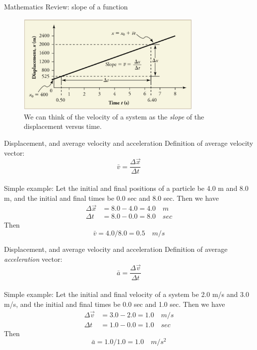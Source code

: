 \documentclass{beamer}
\begin{document}
\begin{frame}{Mathematics Review: slope of a function}
\begin{figure}
\includegraphics[width=0.8\textwidth]{figures/slope.png}
\caption{\label{fig:slope} We can think of the velocity of a system as the \textit{slope} of the displacement versus time.}
\end{figure}
\end{frame}

\begin{frame}{Displacement, and average velocity and acceleration}
Definition of average velocity vector:
\begin{equation}
\boxed{\bar{v} = \frac{\Delta\vec{x}}{\Delta t}}
\end{equation} \\
\vspace{0.5cm}
Simple example: Let the initial and final positions of a particle be 4.0 m and 8.0 m, and the initial and final times be 0.0 sec and 8.0 sec.  Then we have 
\begin{align}
\Delta \vec{x} &= 8.0 - 4.0 = 4.0 \quad m \\
\Delta t &= 8.0 - 0.0 = 8.0 \quad sec
\end{align}
Then
\begin{equation}
\bar{v} = 4.0/8.0 = 0.5 \quad m/s
\end{equation}
\end{frame}

\begin{frame}{Displacement, and average velocity and acceleration}
Definition of average \textit{acceleration} vector:
\begin{equation}
\boxed{\bar{a} = \frac{\Delta \vec{v}}{\Delta t}}
\end{equation} \\
\vspace{0.5cm}
Simple example: Let the initial and final velocity of a system be 2.0 m/s and 3.0 m/s, and the initial and final times be 0.0 sec and 1.0 sec.  Then we have
\begin{align}
\Delta \vec{v} &= 3.0 - 2.0 = 1.0 \quad m/s \\
\Delta t &= 1.0 - 0.0 = 1.0 \quad sec
\end{align}
Then
\begin{equation}
\bar{a} = 1.0/1.0 = 1.0 \quad m/s^2
\end{equation}
\end{frame}
\end{document}
